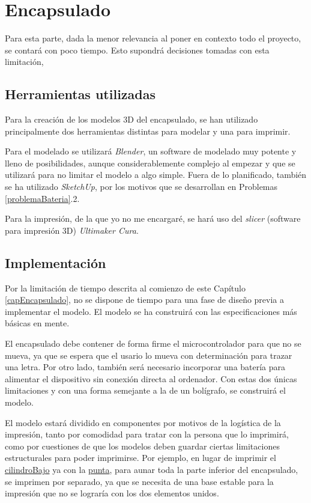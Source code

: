 \chapter{Encapsulado\label{capEncapsulado}}
Para esta parte, dada la menor relevancia al poner en contexto todo el proyecto, se
contará con poco tiempo. Esto supondrá decisiones tomadas con esta limitación,
\section{Herramientas utilizadas}
Para la creación de los modelos 3D del encapsulado, se han utilizado principalmente
dos herramientas distintas para modelar y una para imprimir.

Para el modelado se utilizará \textit{Blender}, un software de modelado muy potente
y lleno de posibilidades, aunque considerablemente complejo al empezar y que se utilizará
para no limitar el modelo a algo simple. Fuera de lo
planificado, también se ha utilizado \textit{SketchUp}, por los motivos que se
desarrollan en Problemas \ref{problemaBateria}.2.

Para la impresión, de la que yo no me encargaré, se hará uso del \textit{slicer}
(software para impresión 3D) \textit{Ultimaker Cura}.

\section{Implementación}
Por la limitación de tiempo descrita al comienzo de este Capítulo \ref{capEncapsulado},
no se dispone de tiempo para una fase de diseño previa a implementar el modelo.
El modelo se ha construirá con las especificaciones más básicas en mente.

El encapsulado debe contener de forma firme el microcontrolador para que no se mueva,
ya que se espera que el usario lo mueva con determinación para trazar una letra. Por
otro lado, también será necesario incorporar una batería para alimentar el dispositivo
sin conexión directa al ordenador. Con estas dos únicas limitaciones y con una forma
semejante a la de un bolígrafo, se construirá el modelo.

El modelo estará dividido en componentes por motivos de la logística de la impresión, tanto
por comodidad para tratar con la persona que lo imprimirá, como por cuestiones de que los
modelos deben guardar ciertas limitaciones estructurales para poder imprimirse. Por ejemplo,
en lugar de imprimir el
\href{https://github.com/AntonioPriego/SmartPen/tree/main/SmartPenModel/Components/cilindroBajo}{cilindroBajo}
ya con la 
\href{https://github.com/AntonioPriego/SmartPen/tree/main/SmartPenModel/Components/punta}{punta},
para aunar toda la parte inferior del encapsulado, se imprimen por separado, ya que se necesita de
una base estable para la impresión que no se lograría con los dos elementos unidos.

